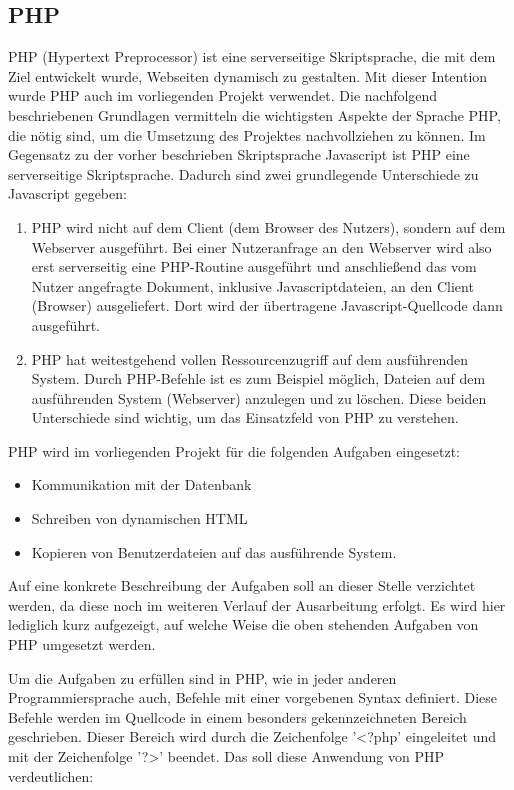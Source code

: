 \subsection{PHP}
\label{sec:Php}

PHP (Hypertext Preprocessor) ist eine serverseitige Skriptsprache, die mit dem
Ziel entwickelt wurde, Webseiten dynamisch zu gestalten. Mit dieser Intention
wurde PHP auch im vorliegenden Projekt verwendet. Die nachfolgend beschriebenen
Grundlagen vermitteln die wichtigsten Aspekte der Sprache PHP, die nötig sind,
um die Umsetzung des Projektes nachvollziehen zu können. Im Gegensatz zu der
vorher beschrieben Skriptsprache Javascript ist PHP eine serverseitige
Skriptsprache. Dadurch sind zwei grundlegende Unterschiede zu Javascript
gegeben:

\begin{enumerate}
  \item PHP wird nicht auf dem Client (dem Browser des Nutzers), sondern auf dem
  Webserver ausgeführt. Bei einer Nutzeranfrage an den Webserver wird also
  erst serverseitig eine PHP-Routine ausgeführt und anschließend das vom Nutzer
  angefragte Dokument, inklusive Javascriptdateien, an den Client (Browser)
  ausgeliefert. Dort wird der übertragene Javascript-Quellcode dann ausgeführt.
  \item PHP hat weitestgehend vollen Ressourcenzugriff auf dem ausführenden
  System. Durch PHP-Befehle ist es zum Beispiel möglich, Dateien auf dem
  ausführenden System (Webserver) anzulegen und zu löschen. Diese beiden
  Unterschiede sind wichtig, um das Einsatzfeld von PHP zu verstehen.
\end{enumerate}

PHP wird im vorliegenden Projekt für die folgenden Aufgaben eingesetzt:

\begin{itemize}
  \item Kommunikation mit der Datenbank
  \item Schreiben von dynamischen HTML
  \item Kopieren von Benutzerdateien auf das ausführende System.
\end{itemize}

Auf eine konkrete Beschreibung der Aufgaben soll an dieser Stelle verzichtet
werden, da diese noch im weiteren Verlauf der Ausarbeitung erfolgt. Es wird hier
lediglich kurz aufgezeigt, auf welche Weise die oben stehenden Aufgaben von PHP
umgesetzt werden.

Um die Aufgaben zu erfüllen sind in PHP, wie in jeder anderen Programmiersprache
auch, Befehle mit einer vorgebenen Syntax definiert. Diese Befehle werden im
Quellcode in einem besonders gekennzeichneten Bereich geschrieben. Dieser
Bereich wird durch die Zeichenfolge '<?php' eingeleitet und mit der
Zeichenfolge '?>' beendet. Das  soll diese Anwendung
von PHP verdeutlichen:

